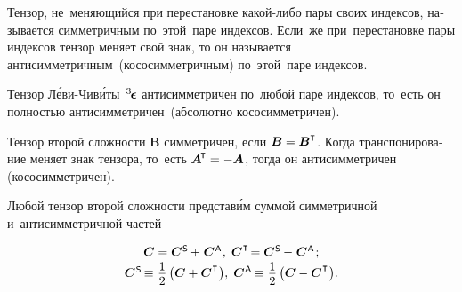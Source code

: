 \begin{otherlanguage}{russian}

Тензор, не~меняющийся при перестановке какой\hbox{-}либо пары своих индексов, называется симметричным по~этой~паре индексов. Если~же при~перестановке пары индексов тензор меняет свой знак, то он называется антисимметричным~(кососимметричным) по~этой~паре индексов.

Тензор Л\'{е}ви\hbox{-\!}Чив\'{и}ты~${^3\hspace{-0.25ex}\bm{\epsilon}}\hspace{.05ex}$ антисимметричен по~любой паре индексов, то~есть он полностью антисимметричен~(абсолютно кососимметричен).

Тензор второй сложности ${\bm{B}}$ симметричен, если ${\bm{B} = \bm{B}^\T}$. Когда транспонирование меняет знак тензора, то~есть ${\bm{A}^{\hspace{-0.1em}\T} = - \bm{A}}$, тогда он антисимметричен (кососимметричен).

Любой тензор второй сложности представ\'{и}м суммой симметричной и~антисимметричной частей

\nopagebreak\vspace{-0.1em}\begin{equation}\begin{array}{c}
\bm{C} = \bm{C}^{\mathsf{\hspace{.1ex}S}} \hspace{-0.1ex}+\hspace{.1ex} \bm{C}^{\mathsf{\hspace{.1ex}A}}\hspace{.1ex} , \;
\bm{C}^{\hspace{.1ex}\T} \hspace{-0.33ex} = \bm{C}^{\mathsf{\hspace{.1ex}S}} \hspace{-0.1ex}-\hspace{.1ex} \bm{C}^{\mathsf{\hspace{.1ex}A}}
\hspace{.2ex} ;
\\[0.2em]
\bm{C}^{\mathsf{\hspace{.1ex}S}} \hspace{-0.22ex} \equiv \hspace{.1ex} \displaystyle \onehalf \left( {\bm{C} + \bm{C}^{\hspace{.1ex}\T}}\hspace{.1ex} \right)\!, \;
\bm{C}^{\mathsf{\hspace{.1ex}A}} \hspace{-0.22ex} \equiv \hspace{.1ex} \displaystyle \onehalf \left( {\bm{C} - \bm{C}^{\hspace{.1ex}\T}}\hspace{.1ex} \right)\!.
\end{array}\end{equation}


\end{otherlanguage}
